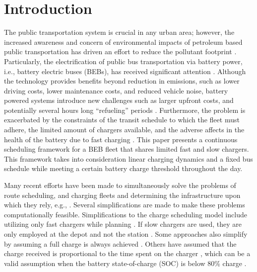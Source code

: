 \documentclass[utf8]{FrontiersinHarvard}
\let\cite\citep                                       %
\begin{document}
\section{Introduction}
\label{sec:introduction}
The public transportation system is crucial in any urban area; however, the increased awareness and concern of
environmental impacts of petroleum based public transportation has driven an effort to reduce the pollutant footprint
\cite{de-2014-simul-elect,xylia-2018-role-charg,guida-2017-zeeus-repor-europ,li-2016-batter-elect}. Particularly,
the electrification of public bus transportation via battery power, i.e., battery electric buses (BEBs), has received
significant attention \cite{li-2016-batter-elect}. Although the technology provides benefits beyond reduction in
emissions, such as lower driving costs, lower maintenance costs, and reduced vehicle noise, battery powered systems
introduce new challenges such as larger upfront costs, and potentially several hours long ``refueling'' periods
\cite{xylia-2018-role-charg,li-2016-batter-elect}. Furthermore, the problem is exacerbated by the constraints of the
transit schedule to which the fleet must adhere, the limited amount of chargers available, and the adverse affects in
the health of the battery due to fast charging \cite{lutsey-2019-updat-elect}. This paper presents a continuous
scheduling framework for a BEB fleet that shares limited fast and slow chargers. This framework takes into consideration
linear charging dynamics and a fixed bus schedule while meeting a certain battery charge threshold throughout the day.

Many recent efforts have been made to simultaneously solve the problems of route scheduling, and charging fleets and
determining the infrastructure upon which they rely, e.g., \cite{wei-2018-optim-spatio,sebastiani-2016-evaluat-elect,hoke-2014-accoun-lithium,wang-2017-elect-vehic}. Several simplifications are made to make these problems
computationally feasible. Simplifications to the charge scheduling model include utilizing only fast chargers while
planning \cite{wei-2018-optim-spatio,sebastiani-2016-evaluat-elect,wang-2017-optim-rechar,zhou-2020-bi-objec,yang-2018-charg-sched,wang-2017-elect-vehic,qin-2016-numer-analy,liu-2020-batter-elect}. If slow chargers are used,
they are only employed at the depot and not the station \cite{he-2020-optim-charg,tang-2019-robus-sched}. Some
approaches also simplify by assuming a full charge is always achieved
\cite{wei-2018-optim-spatio,wang-2017-elect-vehic,zhou-2020-bi-objec,wang-2017-optim-rechar}. Others have assumed
that the charge received is proportional to the time spent on the charger
\cite{liu-2020-batter-elect,yang-2018-charg-sched}, which can be a valid assumption when the battery state-of-charge
(SOC) is below 80\% charge \cite{liu-2020-batter-elect}.
\end{document}
